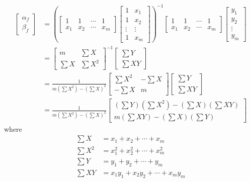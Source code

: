 \begin{align*}
\begin{bmatrix}
\alpha_f \\
\beta_f
\end{bmatrix}
& =
\left(
\begin{bmatrix}
1 & 1 & \cdots & 1 \\
x_1 & x_2 & \cdots & x_m
\end{bmatrix}
\begin{bmatrix}
1 & x_1 \\
1 & x_2 \\
\vdots & \vdots \\
1 & x_m
\end{bmatrix} 
\right)^{-1}
\begin{bmatrix}
1 & 1 & \cdots & 1 \\
x_1 & x_2 & \cdots & x_m
\end{bmatrix}
\begin{bmatrix}
y_1 \\
y_2 \\
\vdots \\
y_m
\end{bmatrix} \\
&= 
\begin{bmatrix}
m & \sum X \\
\sum X & \sum X^2
\end{bmatrix}^{-1}
\begin{bmatrix}
\sum Y \\
\sum XY
\end{bmatrix} \\
&=
\frac{1}{m(\sum X^2) - (\sum X)^2}
\begin{bmatrix}
\sum X^2 & -\sum X \\
-\sum X & m
\end{bmatrix}
\begin{bmatrix}
\sum Y \\
\sum XY
\end{bmatrix} \\
&=
\frac{1}{m(\sum X^2) - (\sum X)^2}
\begin{bmatrix}
(\sum Y) (\sum X^2) - (\sum X) (\sum XY) \\
m (\sum XY) - (\sum X) (\sum Y)
\end{bmatrix}
\end{align*}
where 
\begin{align*}
\sum X &= x_1 + x_2 + \cdots + x_m \\
\sum X^2 &= x_1^2 + x_2^2 + \cdots + x_m^2 \\
\sum Y &= y_1 + y_2 + \cdots + y_m \\
\sum XY &= x_1y_1 + x_2y_2 + \cdots + x_my_m   
\end{align*}
